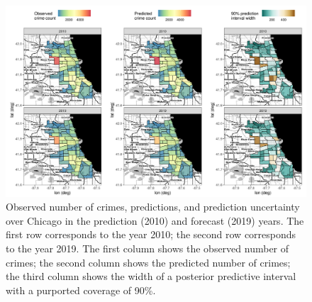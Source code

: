 \documentclass[article]{jss}
\begin{document}
\begin{figure}[t!]
    \centering
    \includegraphics[width = \linewidth]{img/Chicago_data_pred_uncertainty.png}
    \caption{Observed number of crimes, predictions, and prediction uncertainty over 
    Chicago in the prediction (2010) and forecast (2019) years. The first row corresponds to the year 2010; the second row corresponds to the year 2019. The first column shows the observed number of crimes; the second column shows the predicted number of crimes; the third column shows the width of a posterior predictive interval with a purported coverage of 90\%.%
}   
  \label{fig:chicago_validation_predictions}
\end{figure}
\end{document}

